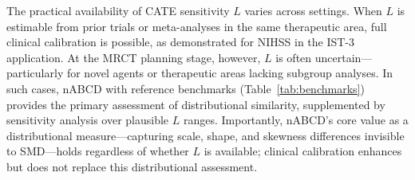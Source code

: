 \documentclass[AMA,Times1COL]{WileyNJDv5}
\begin{document}
The practical availability of CATE sensitivity $L$ varies across settings. When $L$ is estimable from prior trials or meta-analyses in the same therapeutic area, full clinical calibration is possible, as demonstrated for NIHSS in the IST-3 application. At the MRCT planning stage, however, $L$ is often uncertain---particularly for novel agents or therapeutic areas lacking subgroup analyses. In such cases, nABCD with reference benchmarks (Table~\ref{tab:benchmarks}) provides the primary assessment of distributional similarity, supplemented by sensitivity analysis over plausible $L$ ranges. Importantly, nABCD's core value as a distributional measure---capturing scale, shape, and skewness differences invisible to SMD---holds regardless of whether $L$ is available; clinical calibration enhances but does not replace this distributional assessment.
\end{document}
